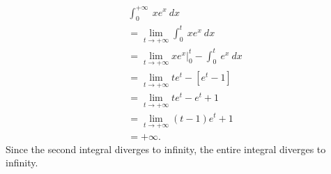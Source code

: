 \documentclass{report}
\begin{document}
        \begin{align*}
            &\int_{0}^{+\infty}\ xe^{x}\ dx \\
            &= \lim\limits_{t \to +\infty}{\int_{0}^{t}\ xe^{x}\ dx} \\
            &= \lim\limits_{t \to +\infty}{xe^{x}\bigg|_0^{t}} - \int_{0}^{t}\ e^{x}\ dx \\
            &= \lim\limits_{t \to +\infty}{te^{t} - [e^{t} - 1]} \\
            &= \lim\limits_{t \to +\infty}{te^{t} - e^{t} + 1} \\
            &= \lim\limits_{t \to +\infty}{(t-1)e^{t} +1} \\
            &=+\infty
        .\end{align*}
        \bigbreak \noindent 
        Since the second integral diverges to infinity, the entire integral diverges to infinity.

        \bigbreak \noindent 
\end{document}
